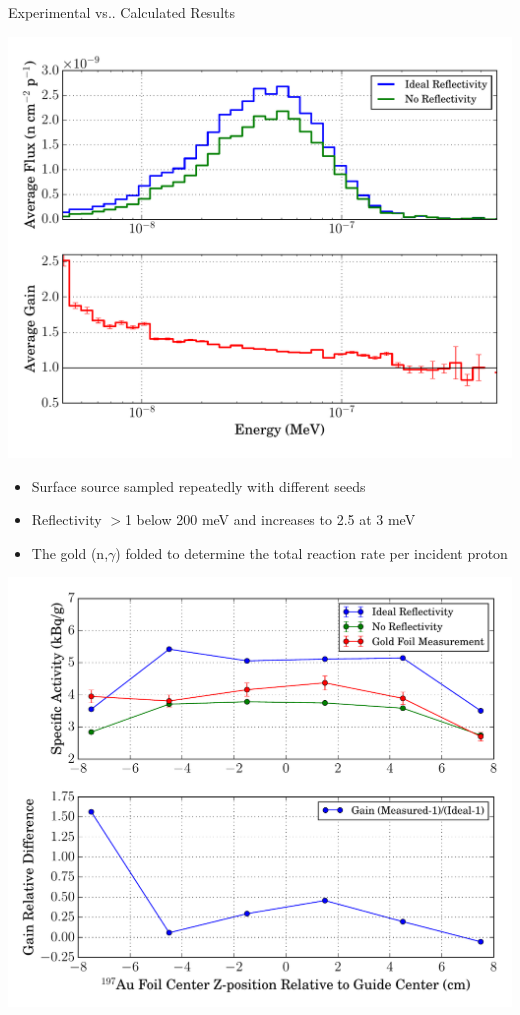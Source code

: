 \documentclass[final,t]{beamer}
\makeatletter
\DeclareRobustCommand\onedot{\futurelet\@let@token\@onedot}
\def\@onedot{\ifx\@let@token.\else.\null\fi\xspace}
\def\vs{{vs}\onedot}
\makeatother
\begin{document}
\begin{frame}{}
\begin{columns}[t]
\begin{column}{.3\linewidth}
      \begin{block}{Experimental \vs Calculated Results}



      \begin{center}
      \includegraphics*[width=0.75\linewidth]{gain.pdf}
      \end{center}

      \begin{itemize}
      \item Surface source sampled repeatedly with different seeds  
      \item Reflectivity $>$1 below 200 meV and increases to 2.5 at 3 meV
      \item The gold (n,$\gamma$) folded to determine the total reaction rate per incident proton
      \end{itemize}




      \begin{center}
      \includegraphics*[width=0.75\linewidth]{GF_act.pdf}
      \end{center}


\end{block}
\end{column}
\end{columns}
\end{frame}
\end{document}
